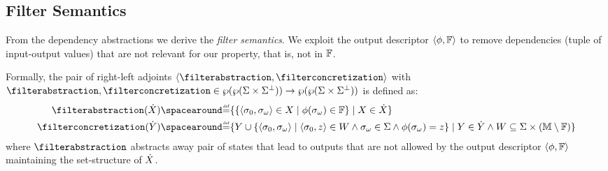 \subsection{Filter Semantics}
\newcommand*{\X}{X}
\newcommand*{\Y}{Y}
\newcommand*{\hiX}{\higher{X}}
\newcommand*{\hiY}{\higher{Y}}

From the dependency abstractions we derive the \textit{filter semantics}.
We exploit the output descriptor $\langle \phi, \mathbb{F} \rangle$ to remove dependencies (tuple of input-output values) that are not relevant for our property, that is, not in $\mathbb{F}$.

Formally, the pair of right-left adjoints $\tuple{\filterabstraction}{\filterconcretization}$ with $\filterabstraction, \filterconcretization\in\dependencytype\to\filtertype$ is defined as:
\begin{align}
  \labeq{filter-abstraction}
  \filterabstraction(\hiX)&\DefeQ\setdef{\setdef{\inputoutputtuple{\defseq}\in X}{\reader(\retrieveoutput{\defseq})\in\filter}}{X\in\hiX}\\
  \labeq{filter-concretization}
  \filterconcretization(\hiY) &\DefeQ \setdef{\Y\setjoin\setdef{\inputoutputtuple{\defseq}}{\tuple{\retrieveinput{\defseq}}{z}\in W \land \retrieveoutput{\defseq}\in \state \land \reader(\retrieveoutput{\defseq})=z}}{
  \Y\in\hiY \land W \subseteq \pair{\state}{(\readerdomain\setminus\filter)}
  }
\end{align}
where $
\filterabstraction$ abstracts away pair of states that lead to outputs that are not allowed by the output descriptor $\langle \phi, \mathbb{F} \rangle$ maintaining the set-structure of $\hiX$.
